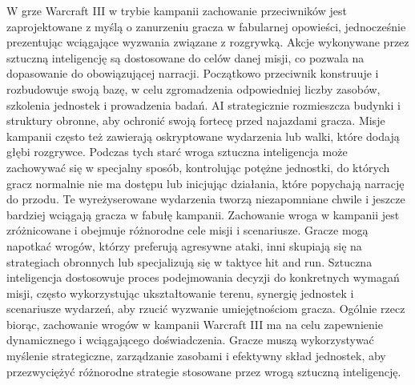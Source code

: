 W grze Warcraft III w trybie kampanii zachowanie przeciwników jest zaprojektowane z myślą o zanurzeniu gracza w fabularnej opowieści, jednocześnie
prezentując wciągające wyzwania związane z rozgrywką. Akcje wykonywane przez sztuczną inteligencję są dostosowane do celów danej misji, co pozwala
na dopasowanie do obowiązującej narracji.
Początkowo przeciwnik konstruuje i rozbudowuje swoją bazę, w celu zgromadzenia odpowiedniej liczby zasobów, szkolenia jednostek i prowadzenia badań.
AI strategicznie rozmieszcza budynki i struktury obronne, aby ochronić swoją fortecę przed najazdami gracza. 
Misje kampanii często też zawierają oskryptowane wydarzenia lub walki, które dodają głębi rozgrywce. Podczas tych starć wroga sztuczna inteligencja
może zachowywać się w specjalny sposób, kontrolując potężne jednostki, do których gracz normalnie nie ma dostępu lub inicjując działania, które popychają
narrację do przodu. Te wyreżyserowane wydarzenia tworzą niezapomniane chwile i jeszcze bardziej wciągają gracza w fabułę kampanii.
Zachowanie wroga w kampanii jest zróżnicowane i obejmuje różnorodne cele misji i scenariusze. Gracze mogą napotkać wrogów, którzy preferują agresywne ataki,
inni skupiają się na strategiach obronnych lub specjalizują się w taktyce hit and run. Sztuczna inteligencja dostosowuje proces podejmowania decyzji do
konkretnych wymagań misji, często wykorzystując ukształtowanie terenu, synergię jednostek i scenariusze wydarzeń, aby rzucić wyzwanie umiejętnościom gracza.
Ogólnie rzecz biorąc, zachowanie wrogów w kampanii Warcraft III ma na celu zapewnienie dynamicznego i wciągającego doświadczenia. Gracze muszą 
wykorzystywać myślenie strategiczne, zarządzanie zasobami i efektywny skład jednostek, aby przezwyciężyć różnorodne strategie stosowane przez wrogą sztuczną inteligencję.
